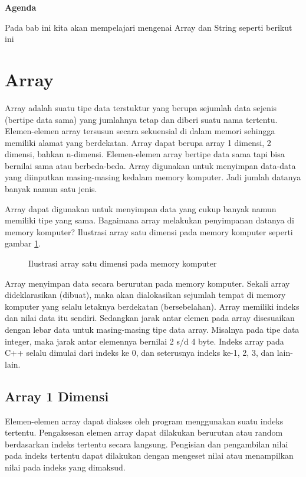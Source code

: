 \textbf{Agenda}

Pada bab ini kita akan mempelajari mengenai Array dan String seperti berikut ini

\minitoc

\section{ Array}\label{array}

Array adalah suatu tipe data terstuktur yang berupa sejumlah data
sejenis (bertipe data sama) yang jumlahnya tetap dan diberi suatu nama
tertentu. Elemen-elemen array tersusun secara sekuensial di dalam memori
sehingga memiliki alamat yang berdekatan. Array dapat berupa array 1
dimensi, 2 dimensi, bahkan n-dimensi. Elemen-elemen array bertipe data
sama tapi bisa bernilai sama atau berbeda-beda. Array digunakan untuk
menyimpan data-data yang diinputkan masing-masing kedalam memory
komputer. Jadi jumlah datanya banyak namun satu jenis.

Array dapat digunakan untuk menyimpan data yang cukup banyak namun
memiliki tipe yang sama. Bagaimana array melakukan penyimpanan datanya
di memory komputer? Ilustrasi array satu dimensi pada memory komputer 
seperti gambar \ref{gambar3-1}.

\begin{figure}[htbp]
\centering
{}
\label{gambar3-1}
\caption{Ilustrasi array satu dimensi pada memory komputer}
\end{figure}

Array menyimpan data secara berurutan pada memory komputer. Sekali array
dideklarasikan (dibuat), maka akan dialokasikan sejumlah tempat di
memory komputer yang selalu letaknya berdekatan (bersebelahan). Array
memiliki indeks dan nilai data itu sendiri. Sedangkan jarak antar elemen
pada array disesuaikan dengan lebar data untuk masing-masing tipe data
array. Misalnya pada tipe data integer, maka jarak antar elemennya
bernilai 2 s/d 4 byte. Indeks array pada C++ selalu dimulai dari indeks
ke 0, dan seterusnya indeks ke-1, 2, 3, dan lain-lain.

\subsection{Array 1 Dimensi}\label{array-1-dimensi}

Elemen-elemen array dapat diakses oleh program menggunakan suatu indeks
tertentu. Pengaksesan elemen array dapat dilakukan berurutan atau random
berdasarkan indeks tertentu secara langsung. Pengisian dan pengambilan
nilai pada indeks tertentu dapat dilakukan dengan mengeset nilai atau
menampilkan nilai pada indeks yang dimaksud.

